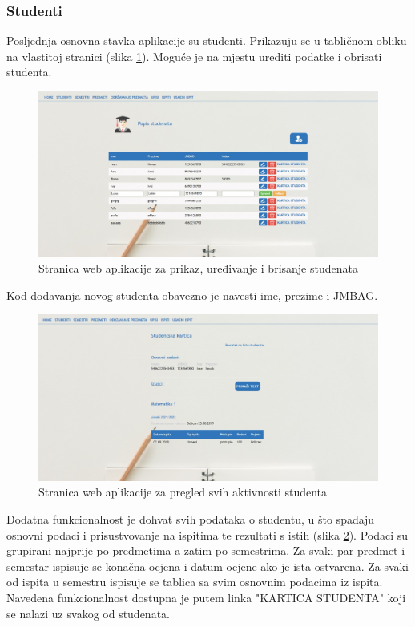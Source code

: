 \documentclass[times, utf8, diplomski]{fer}
\begin{document}
\subsubsection{Studenti}
Posljednja osnovna stavka aplikacije su studenti. Prikazuju se u tabličnom obliku na vlastitoj stranici (slika \ref{fig:student}). Moguće je na mjestu urediti podatke i obrisati studenta. 

\begin{figure}[htb]
\centering
\includegraphics[width=14cm]{studenti_edit.jpg}
\caption{Stranica web aplikacije za prikaz, uređivanje i brisanje studenata }
\label{fig:student}
\end{figure}

Kod dodavanja novog studenta obavezno je navesti ime, prezime i JMBAG.

\begin{figure}[htb]
\centering
\includegraphics[width=14cm]{studentska_kartica.jpg}
\caption{Stranica web aplikacije za pregled svih aktivnosti studenta }
\label{fig:kartica}
\end{figure}

Dodatna funkcionalnost je dohvat svih podataka o studentu, u što spadaju osnovni podaci i prisustvovanje na ispitima te rezultati s istih (slika \ref{fig:kartica}). Podaci su grupirani najprije po predmetima a zatim po semestrima. Za svaki par predmet i semestar ispisuje se konačna ocjena i datum ocjene ako je ista ostvarena. Za svaki od ispita u semestru ispisuje se tablica sa svim osnovnim podacima iz ispita.
Navedena funkcionalnost dostupna je putem linka "KARTICA STUDENTA" koji se nalazi uz svakog od studenata.
\end{document}

